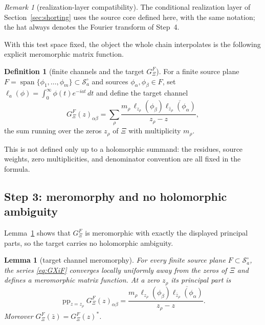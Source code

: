 \documentclass[11pt]{amsart}
\newtheorem{lemma}[theorem]{Lemma}
\theoremstyle{definition}
\newtheorem{definition}[theorem]{Definition}
\theoremstyle{remark}
\newtheorem{remark}[theorem]{Remark}
\theoremstyle{definition}
\newcommand{\cS}{\mathcal{S}}
\newcommand{\GXi}{G_\Xi}
\begin{document}
\begin{remark}[realization-layer compatibility]\label{rmk:core-compat}
The conditional realization layer of Section~\textnormal{\ref{sec:shorting}} uses the source core
defined here, with the same notation; the hat always denotes the Fourier transform of Step~4.
\end{remark}

\noindent With this test space fixed, the object the whole chain interpolates is the following explicit
meromorphic matrix function.

\begin{definition}[finite channels and the target $\GXi^F$]\label{def:target-channel}
For a finite source plane $F=\operatorname{span}\{\phi_1,\ldots,\phi_m\}\subset\cS_a^\circ$ and sources
$\phi_\alpha,\phi_\beta\in F$, set $\ell_a(\phi)=\int_0^\infty \phi(t)e^{-iat}\,dt$ and define the target
channel
\[
   \GXi^F(z)_{\alpha\beta}
   =
   \sum_\rho
   \frac{
      m_\rho\,\ell_{z_\rho}(\phi_\beta)\overline{\ell_{\bar z_\rho}(\phi_\alpha)}
   }{z_\rho-z},
\]
the sum running over the zeros $z_\rho$ of $\Xi$ with multiplicity $m_\rho$.
\end{definition}

\noindent This is not defined only up to a holomorphic summand: the residues, source weights, zero
multiplicities, and denominator convention are all fixed in the formula.

\subsection{Step 3: meromorphy and no holomorphic ambiguity}

Lemma~\ref{lem:GXi-meromorphic} shows that $\GXi^F$ is meromorphic with exactly the displayed principal
parts, so the target carries no holomorphic ambiguity.


\begin{lemma}[target channel meromorphy]\label{lem:GXi-meromorphic}
For every finite source plane $F\subset\cS_a^\circ$, the series \eqref{eq:GXiF} converges locally uniformly
away from the zeros of $\Xi$ and defines a meromorphic matrix function.  At a zero $z_\rho$ its principal
part is
\[
   \operatorname{pp}_{z=z_\rho}\GXi^F(z)_{\alpha\beta}
   =
   \frac{m_\rho\,\ell_{z_\rho}(\phi_\beta)\overline{\ell_{\bar z_\rho}(\phi_\alpha)}}{z_\rho-z}.
\]
Moreover $\GXi^F(\bar z)=\GXi^F(z)^*$.
\end{lemma}
\end{document}

